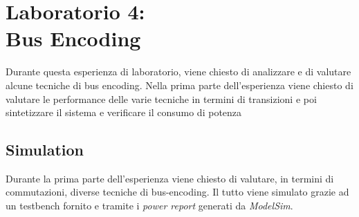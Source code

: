\chapter{Laboratorio 4: \\Bus Encoding}
Durante questa esperienza di laboratorio, viene chiesto di analizzare e di valutare alcune tecniche di bus encoding. Nella prima parte dell'esperienza viene chiesto di valutare le performance delle varie tecniche in termini di transizioni e poi sintetizzare il sistema e verificare il consumo di potenza
\section{Simulation}
Durante la prima parte dell'esperienza viene chiesto di valutare, in termini di commutazioni, diverse tecniche di bus-encoding. Il tutto viene simulato grazie ad un testbench fornito e tramite i \textit{power report} generati da \textit{ModelSim}.
